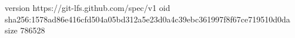 version https://git-lfs.github.com/spec/v1
oid sha256:1578ad86e416cfd504a05bd312a5e23d0a4c39ebc361997f8f67ce719510d0da
size 786528
